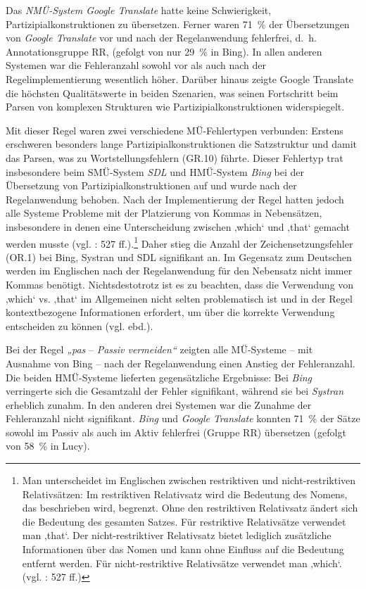 Das \textit{NMÜ-System Google Translate} hatte keine Schwierigkeit, Partizipialkonstruktionen zu übersetzen. Ferner waren 71~\% der Übersetzungen von \textit{Google Translate} vor und nach der Regelanwendung fehlerfrei, d.~h. Annotationsgruppe RR, (gefolgt von nur 29~\% in Bing). In allen anderen Systemen war die Fehleranzahl sowohl vor als auch nach der Regelimplementierung wesentlich höher. Darüber hinaus zeigte Google Translate die höchsten Qualitätswerte in beiden Szenarien, was seinen Fortschritt beim Parsen von komplexen Strukturen wie Partizipialkonstruktionen widerspiegelt.

Mit dieser Regel waren zwei verschiedene MÜ-Fehlertypen verbunden: Erstens erschweren besonders lange Partizipialkonstruktionen die Satzstruktur und damit das Parsen, was zu Wortstellungsfehlern (GR.10) führte. Dieser Fehlertyp trat insbesondere beim SMÜ-System \textit{SDL} und HMÜ-System \textit{Bing} bei der Übersetzung von Partizipialkonstruktionen auf und wurde nach der Regelanwendung behoben. Nach der Implementierung der Regel hatten jedoch alle Systeme Probleme mit der Platzierung von Kommas in Nebensätzen, insbesondere in denen eine Unterscheidung zwischen ‚which‘ und ‚that‘ gemacht werden musste (vgl. \citealt{Swan1980}: 527 ff.).\footnote{\textrm{Man unterscheidet im Englischen zwischen restriktiven und nicht-restriktiven Relativsätzen: Im restriktiven Relativsatz wird die Bedeutung des Nomens, das beschrieben wird, begrenzt. Ohne den restriktiven Relativsatz ändert sich die Bedeutung des gesamten Satzes. Für restriktive Relativsätze verwendet man ‚that‘. Der nicht-restriktiver Relativsatz bietet lediglich zusätzliche Informationen über das Nomen und kann ohne Einfluss auf die Bedeutung entfernt werden. Für nicht-restriktive Relativsätze verwendet man ‚which‘. (vgl. \citealt{Swan1980}: 527 ff.)} } Daher stieg die Anzahl der Zeichensetzungsfehler (OR.1) bei Bing, Systran und SDL signifikant an. Im Gegensatz zum Deutschen werden im Englischen nach der Regelanwendung für den Nebensatz nicht immer Kommas benötigt. Nichtsdestotrotz ist es zu beachten, dass die Verwendung von ‚which‘ vs. ‚that‘ im Allgemeinen nicht selten problematisch ist und in der Regel kontextbezogene Informationen erfordert, um über die korrekte Verwendung entscheiden zu können (vgl. ebd.).

Bei der Regel \textit{„pas} -- \textit{Passiv vermeiden“} zeigten alle MÜ-Systeme -- mit Ausnahme von Bing -- nach der Regelanwendung einen Anstieg der Fehleranzahl. Die beiden HMÜ-Systeme lieferten gegensätzliche Ergebnisse: Bei \textit{Bing} verringerte sich die Gesamtzahl der Fehler signifikant, während sie bei \textit{Systran} erheblich zunahm. In den anderen drei Systemen war die Zunahme der Fehleranzahl nicht signifikant. \textit{Bing} und \textit{Google Translate} konnten 71~\% der Sätze sowohl im Passiv als auch im Aktiv fehlerfrei (Gruppe RR) übersetzen (gefolgt von 58~\% in Lucy).

